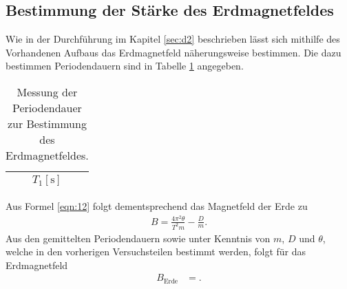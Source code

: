 \subsection{Bestimmung der Stärke des Erdmagnetfeldes}
Wie in der Durchführung im Kapitel \ref{sec:d2} beschrieben lässt sich mithilfe des Vorhandenen Aufbaus das Erdmagnetfeld näherungsweise bestimmen.
Die dazu bestimmen Periodendauern sind in Tabelle \ref{tab:5} angegeben.
\begin{table}[H]
  \centering
  \caption{Messung der Periodendauer zur Bestimmung des Erdmagnetfeldes.}
  \label{tab:5}
  \begin{tabular}{c}
    \toprule
    {$T_1 [\si{\second}]$}\\
    \midrule
    
    \bottomrule
  \end{tabular}
\end{table}
Aus Formel \eqref{eqn:12} folgt dementsprechend das Magnetfeld der Erde zu
\begin{align}
  B = \frac{4 \pi^2 \theta}{T^2 m} - \frac{D}{m}.
\end{align}
Aus den gemittelten Periodendauern sowie unter Kenntnis von $m$, $D$ und $\theta$, welche in den vorherigen Versuchsteilen bestimmt werden, folgt für das Erdmagnetfeld
\begin{align*}
  B_{\text{Erde}} &= .
\end{align*}
%
%    
%
